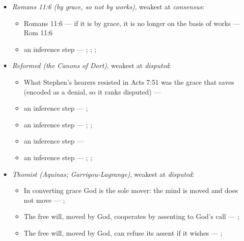 \documentclass[11pt]{article}
\begin{document}
\begin{itemize}
\item \emph{Romans 11:6 (by grace, so not by works)}, weakest at \emph{consensus}:
\begin{itemize}
\item Romans 11:6 — if it is by grace, it is no longer on the basis of works --- Rom 11:6
\item an inference step --- \cite[Trent, Session VI (1547), ch. 8]{tanner-decrees-1990}; \cite[36]{waterworth-trent-1848}; \cite[Five Arminian Articles (1610), art. 4]{schaff-creeds-christendom-3-1977}; \cite[Canons of Dort, III/IV, art. 10]{schaff-creeds-christendom-3-1977}
\end{itemize}
\item \emph{Reformed (the Canons of Dort)}, weakest at \emph{disputed}:
\begin{itemize}
\item What Stephen’s hearers resisted in Acts 7:51 was the grace that saves (encoded as a denial, so it ranks disputed) --- \cite[Canons of Dort, III/IV, art. 9]{schaff-creeds-christendom-3-1977}
\item an inference step --- \cite[ad loc. Eph 2:8]{robertson-word-pictures-4-1931}; \cite[228--229]{calvin-galatians-ephesians-1854}
\item an inference step --- \cite[600]{arminius-works-1-1825}; \cite[681]{arminius-works-1-1825}; \cite[Five Arminian Articles (1610), art. 4]{schaff-creeds-christendom-3-1977}
\item an inference step --- \cite[527--565]{arminius-works-3-1853}
\item an inference step --- \cite[Solid Declaration II.89]{concordia-triglotta-1921}; \cite[Solid Declaration II.60]{concordia-triglotta-1921}; \cite[Solid Declaration XI.41]{concordia-triglotta-1921}
\end{itemize}
\item \emph{Thomist (Aquinas; Garrigou-Lagrange)}, weakest at \emph{disputed}:
\begin{itemize}
\item In converting grace God is the sole mover: the mind is moved and does not move --- \cite[I-II q.111 a.2]{aquinas-summa-1920}; \cite[ch. IV]{garrigou-lagrange-grace-1952}
\item The free will, moved by God, cooperates by assenting to God’s call --- \cite[Trent, Session VI (1547), canon 4]{tanner-decrees-1990}; \cite[45]{waterworth-trent-1848}
\item The free will, moved by God, can refuse its assent if it wishes --- \cite[Trent, Session VI (1547), canon 4]{tanner-decrees-1990}; \cite[45]{waterworth-trent-1848}

\end{itemize}
\end{itemize}
\end{document}
